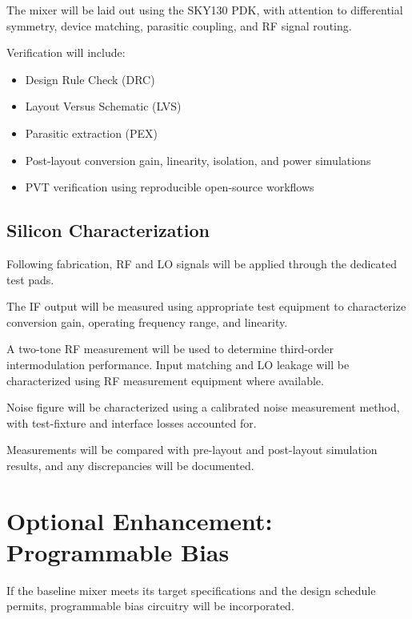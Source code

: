 \documentclass[11pt,letterpaper]{article}
\begin{document}
The mixer will be laid out using the SKY130 PDK, with
attention to differential symmetry, device matching,
parasitic coupling, and RF signal routing.

Verification will include:

\begin{itemize}
    \item Design Rule Check (DRC)

    \item Layout Versus Schematic (LVS)

    \item Parasitic extraction (PEX)

    \item Post-layout conversion gain, linearity,
    isolation, and power simulations

    \item PVT verification using reproducible
    open-source workflows
\end{itemize}


\subsection{Silicon Characterization}

Following fabrication, RF and LO signals will be
applied through the dedicated test pads.

The IF output will be measured using appropriate test
equipment to characterize conversion gain, operating
frequency range, and linearity.

A two-tone RF measurement will be used to determine
third-order intermodulation performance. Input matching
and LO leakage will be characterized using RF measurement
equipment where available.

Noise figure will be characterized using a calibrated
noise measurement method, with test-fixture and interface
losses accounted for.

Measurements will be compared with pre-layout and
post-layout simulation results, and any discrepancies
will be documented.


\section{Optional Enhancement: Programmable Bias}

If the baseline mixer meets its target specifications
and the design schedule permits, programmable bias
circuitry will be incorporated.
\end{document}
